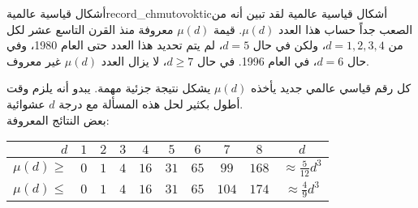 \begin{surferIntroPage}{أشكال قياسية عالمية}{record_chmutovoktic}{أشكال قياسية عالمية}
لقد تبين أنه من الصعب جداً حساب هذا العدد $\mu(d)$.
قيمة $\mu(d)$ معروفة منذ القرن التاسع عشر لكل من $d=1,2,3,4$، ولكن في حال $d=5$، لم يتم تحديد هذا العدد حتى العام 1980، وفي حال $d=6$، في العام 1996.
   في حال $d\ge 7$، لا يزال العدد $\mu(d)$ غير معروف.


    كل رقم قياسي عالمي جديد يأخذه $\mu(d)$  يشكل نتيجة جزئية مهمة. يبدو أنه يلزم وقت أطول بكثير لحل هذه المسألة مع درجة $d$ عشوائية.\\ بعض النتائج المعروفة:

   \begin{center}
      \begin{tabular}{r|cccccccc|c}
        $d$ & $1$ & $2$ & $3$ & $4$ & $5$ & $6$ & $7$ & $8$ & $d$\\
        \hline
        \hline
        \rule{0pt}{1.2em}$\mu(d)\ge$ & $0$ & $1$ & $4$ & $16$ & $31$ & $65$ &
        $99$ & $168$ &
        $\approx \frac{5}{12}d^3$\\[0.3em]
        \hline
        \rule{0pt}{1.2em}$\mu(d)\le$ & $0$ & $1$ & $4$ & $16$ & $31$ & $65$ &
        $104$ & $174$ & $\approx \frac{4}{9}d^3$
      \end{tabular}
    \end{center}
\end{surferIntroPage}
